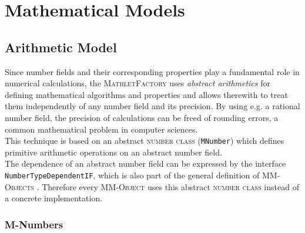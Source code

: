 \documentclass[a4paper,12pt]{article}
\newcommand{\name}[1]{\textsc{#1}}
\newcommand{\codename}[1]{\texttt{\small #1}}
\newcommand{\mf}{\name{MathletFactory }}
\newcommand{\nc}{\name{number class }}
\newcommand{\mmo}{\name{MM-Object }}
\newcommand{\mmos}{\name{MM-Objects }}
\begin{document}



\newpage

\section{Mathematical Models}

\subsection{Arithmetic Model}
\label{subsection:arithmetic_model}

Since number fields and their corresponding properties play a fundamental role in numerical calculations,
the \mf uses \textit{abstract arithmetics} for defining mathematical algorithms and properties and allows
therewith to treat them independently of any number field and its precision. By using e.g. a rational 
number field, the precision of calculations can be freed of rounding errors, a common mathematical 
problem in computer sciences.\\
This technique is based on an abstract \nc (\codename{MNumber}) which defines primitive arithmetic operations 
on an abstract number field.\\
The dependence of an abstract number field can be expressed by the interface \codename{NumberTypeDependentIF},
which is also part of the general definition of \mmos. Therefore every \mmo uses this abstract \nc 
instead of a concrete implementation.

\subsubsection*{M-Numbers}
\end{document}

